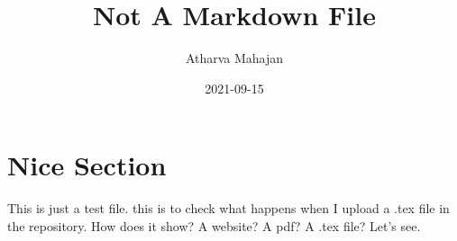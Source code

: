 \documentclass{article}
\title{Not A Markdown File}
\author{Atharva Mahajan}
\date{2021-09-15}
\begin{document}
\maketitle
\section{Nice Section}
This is just a test file. this is to check what happens when I upload a .tex file in the repository. How does it show? A website? A pdf? A .tex file? Let's see.
		
\end{document}
